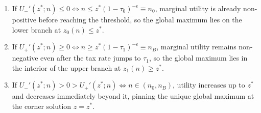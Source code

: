 \begin{enumerate}
    \item If $U_-'(z^*; n) \le 0 \iff n \le z^*(1-\tau_0)^{-\epsilon} \equiv n_0$, marginal utility is already non-positive before reaching the threshold, so the global maximum lies on the lower branch at $z_0(n) \le z^*$.
    \item If $U_+'(z^*; n) \ge 0 \iff n \ge z^*(1-\tau_1)^{-\epsilon} \equiv n_B$, marginal utility remains non-negative even after the tax rate jumps to $\tau_1$, so the global maximum lies in the interior of the upper branch at $z_1(n) \ge z^*$.
    \item If $U_-'(z^*; n) > 0 > U_+'(z^*; n) \iff n \in (n_0, n_B)$, utility increases up to $z^*$ and decreases immediately beyond it, pinning the unique global maximum at the corner solution $z = z^*$.
\end{enumerate}

